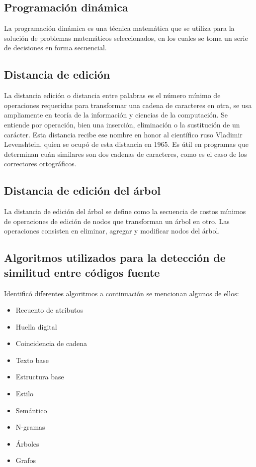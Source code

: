 \subsection{Programación dinámica}
La programación dinámica es una técnica matemática que se utiliza para la solución de problemas matemáticos seleccionados, en los cuales se toma un serie de decisiones en forma secuencial.

\subsection{Distancia de edición}
La distancia edición o distancia entre palabras es el número mínimo de operaciones requeridas para transformar una cadena de caracteres en otra, se usa ampliamente en teoría de la información y ciencias de la computación. Se entiende por operación, bien una inserción, eliminación o la sustitución de un carácter. Esta distancia recibe ese nombre en honor al científico ruso Vladimir Levenshtein, quien se ocupó de esta distancia en 1965. Es útil en programas que determinan cuán similares son dos cadenas de caracteres, como es el caso de los correctores ortográficos.

\subsection{Distancia de edición del árbol}
La distancia de edición del árbol se define como la secuencia de costos mínimos de operaciones de edición de nodos que transforman un árbol en otro. Las operaciones consisten en eliminar, agregar y modificar nodos del árbol.

\subsection{Algoritmos utilizados para la detección de similitud entre códigos fuente}
\cite{10.1145/3313290} Identificó diferentes algoritmos a continuación se mencionan algunos de ellos:

\begin{itemize}
    \item Recuento de atributos
    \item Huella digital
    \item Coincidencia de cadena
    \item Texto base
    \item Estructura base
    \item Estilo
    \item Semántico
    \item N-gramas
    \item Árboles
    \item Grafos
\end{itemize}


